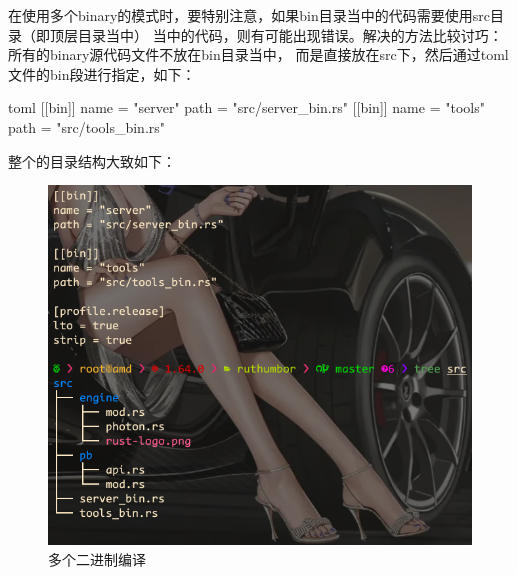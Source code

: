 \begin{warn}
在使用多个binary的模式时，要特别注意，如果bin目录当中的代码需要使用src目录（即顶层目录当中）
当中的代码，则有可能出现错误。解决的方法比较讨巧：所有的binary源代码文件不放在bin目录当中，
而是直接放在src下，然后通过toml文件的bin段进行指定，如下：
\begin{code-block}{toml}
[[bin]]
name = "server"
path = "src/server_bin.rs"
[[bin]]
name = "tools"
path = "src/tools_bin.rs"
\end{code-block}

整个的目录结构大致如下：
\begin{figure}[H]
  \centering
  \includegraphics[width=\linewidth]{rust_multi_bin.png}
  \caption{多个二进制编译}
  \label{fig:rust_multi_bin}
\end{figure}
\end{warn}

